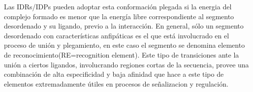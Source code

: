 Las IDRs/IDPs pueden adoptar esta conformación plegada si la energia del complejo formado es menor que la energía libre correspondiente al segmento desordenado y su ligando, previo a la interacción.
En general, sólo un segmento desordenado con características anfipáticas es el que está involucrado en el proceso de unión y plegamiento, en este caso el segmento se denomina elemento de reconocimiento(RE=recognition element). 
Este tipo de transiciones ante la unión a ciertos ligandos, involucrando regiones cortas de la secuencia, provee una combinación de alta especificidad y baja afinidad que hace a este tipo de elementos extremadamente útiles en procesos de señalizacion y regulación.

